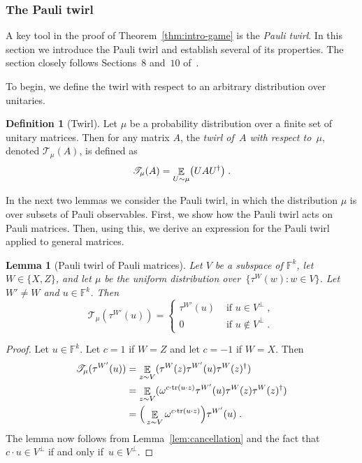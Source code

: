 \documentclass[11pt]{article}
\newtheorem{lemma}[theorem]{Lemma}
\theoremstyle{definition}
\newtheorem{definition}[theorem]{Definition}
\newcommand{\F}{\ensuremath{\mathbb{F}}}
\DeclareMathOperator{\tr}{tr}
\newcommand{\E}{\mathop{\mathbb{E}}\displaylimits} %
\begin{document}
\subsubsection{The Pauli twirl}

A key tool in the proof of Theorem~\ref{thm:intro-game} is the \emph{Pauli
  twirl}.
In this section we introduce the Pauli twirl and establish several of its
properties.
The section closely follows Sections~$8$ and~$10$ of~\cite{NW19}. 

To begin, we define the twirl with respect to an arbitrary distribution over
unitaries.

\begin{definition}[Twirl]
  \label{def:mixing}
  Let $\mu$ be a probability distribution over a finite set of unitary matrices.
  Then for any matrix $A$, the \emph{twirl of~$A$ with respect to~$\mu$},
  denoted $\mathscr{T}_\mu(A)$, is defined as
  \begin{equation*}
    \mathscr{T}_\mu (A) = \E_{U \sim \mu} \bigl( U A U^\dagger \bigr)\;.
  \end{equation*}
\end{definition}

In the next two lemmas we consider the Pauli twirl, in which the distribution
$\mu$ is over subsets of Pauli observables.
First, we show how the Pauli twirl acts on Pauli matrices.
Then, using this, we derive an expression for the Pauli twirl applied to general
matrices.

\begin{lemma}[Pauli twirl of Pauli matrices]
  \label{lem:twirl-pauli}
  Let $V$ be a subspace of $\F^k$, let $W \in \{X, Z\}$, and let $\mu$ be the
  uniform distribution over~$\{\tau^W(w) : w \in V\}$.
  Let $W'\neq W$ and $u\in \F^k$.
  Then
  \begin{equation*}
    \mathscr{T}_\mu(\tau^{W'}(u)) =
    \begin{cases}
      \tau^{W'}(u)&\text{ if }u \in V^{\perp}\;,\\
      0 &\text{ if }u \notin V^{\perp}\;.
    \end{cases}
  \end{equation*}
\end{lemma}

\begin{proof}
  Let $u\in \F^k$.
  Let $c = 1$ if $W = Z$ and let $c = -1$ if $W = X$.
  Then
  \begin{align*}
    \mathscr{T}_\mu(\tau^{W'}(u))
    &= \E_{z \sim V} (\tau^W(z)  \tau^{W'}(u) \tau^W(z)^\dagger)\\
    &= \E_{z \sim V} (\omega^{c\cdot \tr(u \cdot z)} \tau^{W'}(u) \tau^W(z)
      \tau^W(z)^\dagger)\\
    &= \Big(\E_{z \sim V} \omega^{c\cdot \tr(u \cdot z)}\Big) \tau^{W'}(u)\;.
  \end{align*}
  The lemma now follows from Lemma~\ref{lem:cancellation}
  and the fact that $c \cdot u \in V^\perp$ if and only if~$u\in V^\perp$.
\end{proof}
\end{document}
